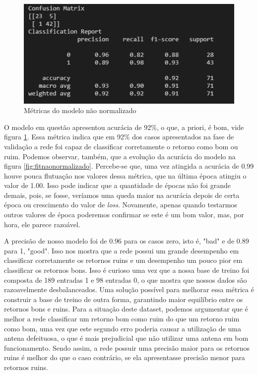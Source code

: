 \documentclass[12pt]{article}
\begin{document}
\begin{figure}[H]
	\centering
	\includegraphics[width=0.7\linewidth]{Imagens/resultadoNaoNormalizado}
	\caption{Métricas do modelo não normalizado}
	\label{fig:resultadonaonormalizado}
\end{figure}

O modelo em questão apresentou acurácia de 92\%, o que, a priori, é bom, vide figura \ref{fig:resultadonaonormalizado}. Essa métrica indica que em 92\% dos casos apresentados na fase de validação a rede foi capaz de classificar corretamente o retorno como bom ou ruim. Podemos observar, também, que a evolução da acurácia do modelo na figura \ref{fig:fitnaonormalizado}. Percebe-se que, uma vez atingida a acurácia de 0.99 houve pouca flutuação nos valores dessa métrica, que na última época atingiu o valor de 1.00. Isso pode indicar que a quantidade de épocas não foi grande demais, pois, se fosse, veríamos uma queda maior na acurácia depois de certa época ou crescimento do valor de \textit{loss}. Novamente, apenas quando testarmos outros valores de época poderemos confirmar se este é um bom valor, mas, por hora, ele parece razoável. 

A precisão de nosso modelo foi de 0.96 para os casos zero, isto é, "bad" e de 0.89 para 1, "good". Isso nos mostra que a rede possui um grande desempenho em classificar corretamente os retornos ruins e um desempenho um pouco pior em classificar os retornos bons. Isso é curioso uma vez que a nossa base de treino foi composta de 189 entradas 1 e 98 entradas 0, o que mostra que nossos dados são razoavelmente desbalanceados. Uma solução possível para melhorar essa métrica é construir a base de treino de outra forma, garantindo maior equilíbrio entre os retornos bons e ruins. Para a situação deste dataset, podemos argumentar que é melhor a rede classificar um retorno bom como ruim do que um retorno ruim como bom, uma vez que este segundo erro poderia causar a utilização de uma antena defeituosa, o que é mais prejudicial que não utilizar uma antena em bom funcionamento. Sendo assim, a rede possuir uma precisão maior para os retornos ruins é melhor do que o caso contrário, se ela apresentasse precisão menor para retornos ruins.
\end{document}
